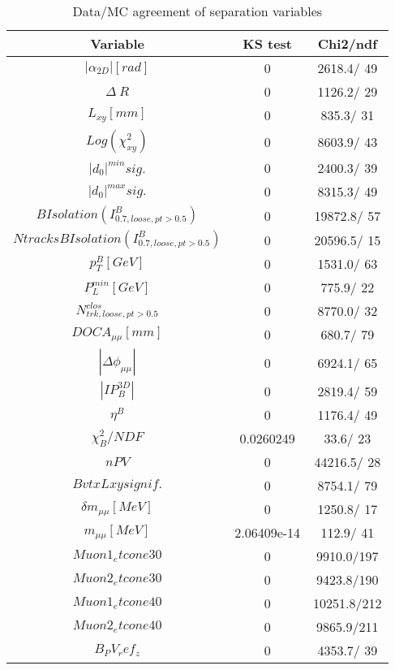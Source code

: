 \documentclass{article}
\begin{document}
\begin{table}[htbp]
\caption{\label{tab:sepVars}Data/MC agreement of separation variables}
\begin{center}
\begin{tabular}{c|c|c}
Variable & KS test & Chi2/ndf \\
\hline
$|\alpha_{2D}| [rad]$ & 0 & 2618.4/ 49\\
\hline
$\Delta~R$ & 0 & 1126.2/ 29\\
\hline
$L_{xy} [mm]$ & 0 & 835.3/ 31\\
\hline
$Log(\chi^{2}_{xy})$ & 0 & 8603.9/ 43\\
\hline
$|d_{0}|^{min} sig.$ & 0 & 2400.3/ 39\\
\hline
$|d_{0}|^{max} sig.$ & 0 & 8315.3/ 49\\
\hline
$B Isolation (I^{B}_{0.7, loose, pt>0.5})$ & 0 & 19872.8/ 57\\
\hline
$Ntracks B Isolation (I^{B}_{0.7, loose, pt>0.5})$ & 0 & 20596.5/ 15\\
\hline
$p_{T}^{B} [GeV]$ & 0 & 1531.0/ 63\\
\hline
$P^{min}_{L} [GeV]$ & 0 & 775.9/ 22\\
\hline
$N^{clos}_{trk, loose, pt>0.5}$ & 0 & 8770.0/ 32\\
\hline
$DOCA_{\mu\mu} [mm]$ & 0 & 680.7/ 79\\
\hline
$|\Delta\phi_{\mu\mu}|$ & 0 & 6924.1/ 65\\
\hline
$|IP_{B}^{3D}|$ & 0 & 2819.4/ 59\\
\hline
$\eta^{B}$ & 0 & 1176.4/ 49\\
\hline
$\chi^{2}_{B}/NDF$ & 0.0260249 &  33.6/ 23\\
\hline
$nPV$ & 0 & 44216.5/ 28\\
\hline
$BvtxLxy signif.$ & 0 & 8754.1/ 79\\
\hline
$\delta m_{\mu\mu} [MeV]$ & 0 & 1250.8/ 17\\
\hline
$m_{\mu\mu} [MeV]$ & 2.06409e-14 & 112.9/ 41\\
\hline
$Muon1_etcone30$ & 0 & 9910.0/197\\
\hline
$Muon2_etcone30$ & 0 & 9423.8/190\\
\hline
$Muon1_etcone40$ & 0 & 10251.8/212\\
\hline
$Muon2_etcone40$ & 0 & 9865.9/211\\
\hline
$B_PV_ref_z$ & 0 & 4353.7/ 39\\
\hline
\end{tabular}
\end{center}
\end{table}
\end{document}
